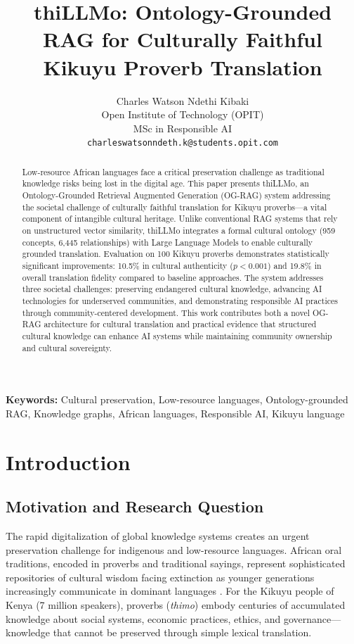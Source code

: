 \documentclass[a4paper,11pt]{article}
\title{\textbf{thiLLMo: Ontology-Grounded RAG for Culturally Faithful Kikuyu Proverb Translation}}
\author{
    Charles Watson Ndethi Kibaki \\
    Open Institute of Technology (OPIT) \\
    MSc in Responsible AI \\
    \texttt{charleswatsonndeth.k@students.opit.com}
}
\date{}
\begin{document}
\maketitle

\begin{abstract}
Low-resource African languages face a critical preservation challenge as traditional knowledge risks being lost in the digital age. This paper presents thiLLMo, an Ontology-Grounded Retrieval Augmented Generation (OG-RAG) system addressing the societal challenge of culturally faithful translation for Kikuyu proverbs—a vital component of intangible cultural heritage. Unlike conventional RAG systems that rely on unstructured vector similarity, thiLLMo integrates a formal cultural ontology (959 concepts, 6,445 relationships) with Large Language Models to enable culturally grounded translation. Evaluation on 100 Kikuyu proverbs demonstrates statistically significant improvements: 10.5\% in cultural authenticity ($p < 0.001$) and 19.8\% in overall translation fidelity compared to baseline approaches. The system addresses three societal challenges: preserving endangered cultural knowledge, advancing AI technologies for underserved communities, and demonstrating responsible AI practices through community-centered development. This work contributes both a novel OG-RAG architecture for cultural translation and practical evidence that structured cultural knowledge can enhance AI systems while maintaining community ownership and cultural sovereignty.
\end{abstract}

\textbf{Keywords:} Cultural preservation, Low-resource languages, Ontology-grounded RAG, Knowledge graphs, African languages, Responsible AI, Kikuyu language

\section{Introduction}

\subsection{Motivation and Research Question}

The rapid digitalization of global knowledge systems creates an urgent preservation challenge for indigenous and low-resource languages. African oral traditions, encoded in proverbs and traditional sayings, represent sophisticated repositories of cultural wisdom facing extinction as younger generations increasingly communicate in dominant languages \cite{finnegan2012oral}. For the Kikuyu people of Kenya (7 million speakers), proverbs (\emph{thimo}) embody centuries of accumulated knowledge about social systems, economic practices, ethics, and governance—knowledge that cannot be preserved through simple lexical translation.
\end{document}
